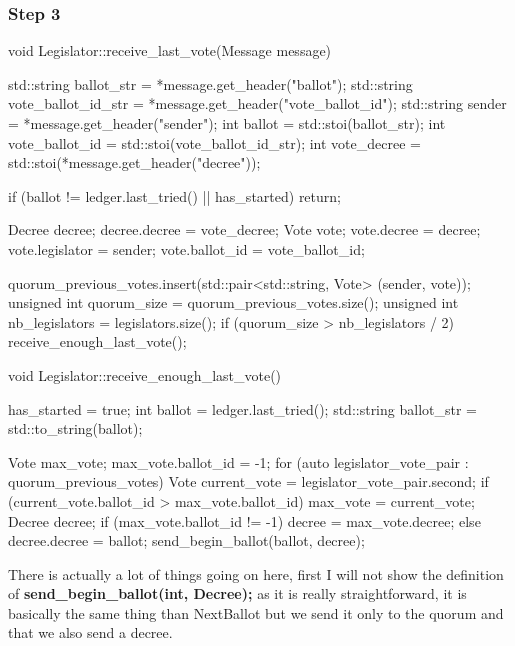 \documentclass{article}
\begin{document}
\subsubsection{Step 3}
\begin{code}
void Legislator::receive_last_vote(Message message)
{
    std::string ballot_str = *message.get_header("ballot");
    std::string vote_ballot_id_str = *message.get_header("vote_ballot_id");
    std::string sender =  *message.get_header("sender");
    int ballot = std::stoi(ballot_str);
    int vote_ballot_id = std::stoi(vote_ballot_id_str);
    int vote_decree = std::stoi(*message.get_header("decree"));

    if (ballot != ledger.last_tried() || has_started)
        return;

    Decree decree;
    decree.decree = vote_decree;
    Vote vote;
    vote.decree = decree;
    vote.legislator = sender;
    vote.ballot_id = vote_ballot_id;

    quorum_previous_votes.insert(std::pair<std::string, Vote>
            (sender, vote));
    unsigned int quorum_size = quorum_previous_votes.size();
    unsigned int nb_legislators = legislators.size();
    if (quorum_size > nb_legislators / 2)
        receive_enough_last_vote();
}

void Legislator::receive_enough_last_vote()
{
    has_started = true;
    int ballot = ledger.last_tried();
    std::string ballot_str = std::to_string(ballot);

    Vote max_vote;
    max_vote.ballot_id = -1;
    for (auto legislator_vote_pair : quorum_previous_votes)
    {
        Vote current_vote = legislator_vote_pair.second;
        if (current_vote.ballot_id > max_vote.ballot_id)
            max_vote = current_vote;
    }
    Decree decree;
    if (max_vote.ballot_id != -1)
        decree = max_vote.decree;
    else
        decree.decree = ballot;
    send_begin_ballot(ballot, decree);
}
\end{code}
There is actually a lot of things going on here, first I will not show the definition of \textbf{send\_begin\_ballot(int, Decree);} as it is really straightforward, it is basically the same thing than NextBallot but we send it only to the quorum and that we also send a decree.
\end{document}
